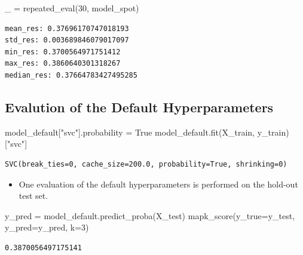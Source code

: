 \documentclass[
  letterpaper,
  DIV=11,
  numbers=noendperiod]{scrreprt}
\newenvironment{Shaded}{\begin{snugshade}}{\end{snugshade}}
\newcommand{\DecValTok}[1]{\textcolor[rgb]{0.68,0.00,0.00}{#1}}
\newcommand{\NormalTok}[1]{\textcolor[rgb]{0.00,0.23,0.31}{#1}}
\newcommand{\OperatorTok}[1]{\textcolor[rgb]{0.37,0.37,0.37}{#1}}
\newcommand{\StringTok}[1]{\textcolor[rgb]{0.13,0.47,0.30}{#1}}
\newcommand{\VariableTok}[1]{\textcolor[rgb]{0.07,0.07,0.07}{#1}}
\providecommand{\tightlist}{%
  \setlength{\itemsep}{0pt}\setlength{\parskip}{0pt}}\usepackage{longtable,booktabs,array}
\begin{document}
\begin{Shaded}
\begin{Highlighting}[]
\NormalTok{\_ }\OperatorTok{=}\NormalTok{ repeated\_eval(}\DecValTok{30}\NormalTok{, model\_spot)}
\end{Highlighting}
\end{Shaded}

\begin{verbatim}
mean_res: 0.37696170747018193
std_res: 0.003689846079017097
min_res: 0.3700564971751412
max_res: 0.3860640301318267
median_res: 0.37664783427495285
\end{verbatim}

\hypertarget{evalution-of-the-default-hyperparameters-2}{%
\subsection{Evalution of the Default
Hyperparameters}\label{evalution-of-the-default-hyperparameters-2}}

\begin{Shaded}
\begin{Highlighting}[]
\NormalTok{model\_default[}\StringTok{"svc"}\NormalTok{].probability }\OperatorTok{=} \VariableTok{True}
\NormalTok{model\_default.fit(X\_train, y\_train)[}\StringTok{"svc"}\NormalTok{]}
\end{Highlighting}
\end{Shaded}

\begin{verbatim}
SVC(break_ties=0, cache_size=200.0, probability=True, shrinking=0)
\end{verbatim}

\begin{itemize}
\tightlist
\item
  One evaluation of the default hyperparameters is performed on the
  hold-out test set.
\end{itemize}

\begin{Shaded}
\begin{Highlighting}[]
\NormalTok{y\_pred }\OperatorTok{=}\NormalTok{ model\_default.predict\_proba(X\_test)}
\NormalTok{mapk\_score(y\_true}\OperatorTok{=}\NormalTok{y\_test, y\_pred}\OperatorTok{=}\NormalTok{y\_pred, k}\OperatorTok{=}\DecValTok{3}\NormalTok{)}
\end{Highlighting}
\end{Shaded}

\begin{verbatim}
0.3870056497175141
\end{verbatim}
\end{document}
